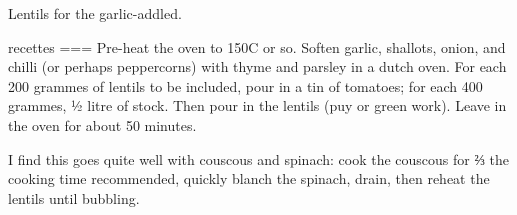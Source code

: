 Lentils for the garlic-addled.

recettes
===
Pre-heat the oven to 150C or so. Soften garlic, shallots, onion, and chilli (or perhaps peppercorns) with thyme and parsley in a dutch oven. For each 200 grammes of lentils to be included, pour in a tin of tomatoes; for each 400 grammes, ½ litre of stock. Then pour in the lentils (puy or green work). Leave in the oven for about 50 minutes.

I find this goes quite well with couscous and spinach: cook the couscous for ⅔ the cooking time recommended, quickly blanch the spinach, drain, then reheat the lentils until bubbling.